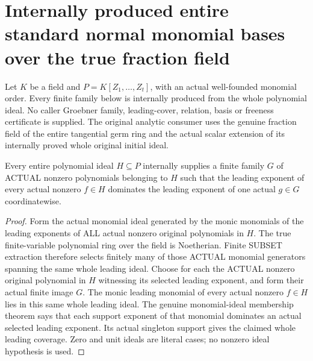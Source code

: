 \section{Internally produced entire standard normal monomial bases over the true fraction field}
Let $K$ be a field and $P=K[Z_1,\ldots,Z_t]$, with an actual well-founded
monomial order. Every finite family below is internally produced from the
whole polynomial ideal. No caller Groebner family, leading-cover, relation,
basis or freeness certificate is supplied. The original analytic consumer
uses the genuine fraction field of the entire tangential germ ring and the
actual scalar extension of its internally proved whole original initial ideal.

\begin{theorem}
\label{hir:relative-normal-standard-internal-leading-generators}
\leanok
{}
Every entire polynomial ideal $H\subseteq P$ internally supplies a finite
family $G$ of ACTUAL nonzero polynomials belonging to $H$ such that the
leading exponent of every actual nonzero $f\in H$ dominates the leading
exponent of one actual $g\in G$ coordinatewise.
\end{theorem}
\begin{proof}
Form the actual monomial ideal generated by the monic monomials of the
leading exponents of ALL actual nonzero original polynomials in $H$.
The true finite-variable polynomial ring over the field is Noetherian.
Finite SUBSET extraction therefore selects finitely many of those ACTUAL
monomial generators spanning the same whole leading ideal. Choose for each
the ACTUAL nonzero original polynomial in $H$ witnessing its selected
leading exponent, and form their actual finite image $G$. The monic leading
monomial of every actual nonzero $f\in H$ lies in this same whole leading
ideal. The genuine monomial-ideal membership theorem says that each support
exponent of that monomial dominates an actual selected leading exponent.
Its actual singleton support gives the claimed whole leading coverage.
Zero and unit ideals are literal cases; no nonzero ideal hypothesis is used.
\end{proof}

